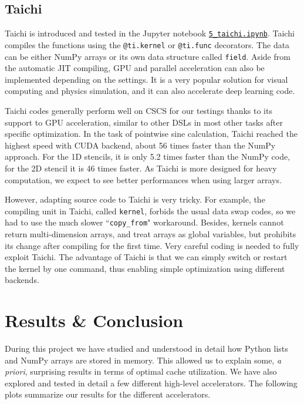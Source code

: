 \documentclass[12pt]{article}
\begin{document}
\subsection{Taichi}

Taichi is introduced and tested in the Jupyter notebook \href{run:./5_taichi.ipynb}{\texttt{5\_taichi.ipynb}}. Taichi compiles the functions using the \texttt{@ti.kernel} or \texttt{@ti.func} decorators. The data can be either NumPy arrays or its own data structure called \texttt{field}. Aside from the automatic JIT compiling, GPU and parallel acceleration can also be implemented depending on the settings. It is a very popular solution for visual computing and physics simulation, and it can also accelerate deep learning code.

Taichi codes generally perform well on CSCS for our testings thanks to its support to GPU acceleration, similar to other DSLs in most other tasks after specific optimization. In the task of pointwise sine calculation, Taichi reached the highest speed with CUDA backend, about 56 times faster than the NumPy approach. For the 1D stencils, it is only 5.2 times faster than the NumPy code, for the 2D stencil it is 46 times faster. As Taichi is more designed for heavy computation, we expect to see better performances when using larger arrays.

However, adapting source code to Taichi is very tricky. For example, the compiling unit in Taichi, called \texttt{kernel}, forbids the usual data swap codes, so we had to use the much slower ``\texttt{copy\_from}" workaround. Besides, kernels cannot return multi-dimension arrays, and treat arrays as global variables, but prohibits its change after compiling for the first time. Very careful coding is needed to fully exploit Taichi. The advantage of Taichi is that we can simply switch or restart the kernel by one command, thus enabling simple optimization using different backends.


\section{Results \& Conclusion}

During this project we have studied and understood in detail how Python lists and NumPy arrays are stored in memory. This allowed us to explain some, \emph{a priori}, surprising results in terms of optimal cache utilization. We have also explored and tested in detail a few different high-level accelerators. The following plots summarize our results for the different accelerators.
\end{document}

